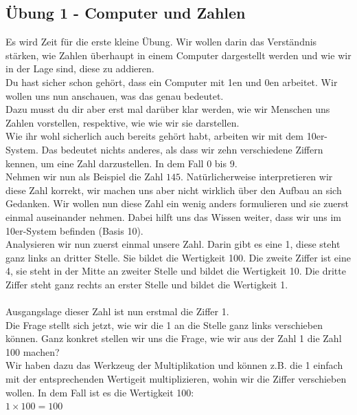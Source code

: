 \subsection{Übung 1 - Computer und Zahlen}
Es wird Zeit für die erste kleine Übung. Wir wollen darin das Verständnis stärken, wie Zahlen überhaupt in einem Computer
dargestellt werden und wie wir in der Lage sind, diese zu addieren.\\
Du hast sicher schon gehört, dass ein Computer mit 1en und 0en arbeitet. Wir wollen uns nun anschauen, was das genau bedeutet.\\
Dazu musst du dir aber erst mal darüber klar werden, wie wir Menschen uns Zahlen vorstellen, respektive, wie wie wir
sie darstellen.\\
Wie ihr wohl sicherlich auch bereits gehört habt, arbeiten wir mit dem 10er-System. Das bedeutet nichts anderes, als dass
wir zehn verschiedene Ziffern kennen, um eine Zahl darzustellen. In dem Fall 0 bis 9.\\
Nehmen wir nun als Beispiel die Zahl $145$.
Natürlicherweise interpretieren wir diese Zahl korrekt, wir machen uns aber nicht
wirklich über den Aufbau an sich Gedanken. Wir wollen nun diese Zahl ein wenig anders formulieren und sie zuerst einmal
auseinander nehmen. Dabei hilft uns das Wissen weiter, dass wir uns im 10er-System befinden (Basis 10).\\
Analysieren wir nun zuerst einmal unsere Zahl. Darin gibt es eine 1, diese steht ganz links an dritter Stelle. Sie bildet die Wertigkeit 100.
Die zweite Ziffer ist eine  4, sie steht in der Mitte an zweiter Stelle und bildet die Wertigkeit 10. Die dritte Ziffer steht ganz rechts an erster Stelle
und bildet die Wertigkeit 1.\\\\
Ausgangslage dieser Zahl ist nun erstmal die Ziffer 1.\\
Die Frage stellt sich jetzt, wie wir die 1 an die Stelle ganz links verschieben können. Ganz konkret stellen wir uns die
Frage, wie wir aus der Zahl 1 die Zahl 100 machen?\\
Wir haben dazu das Werkzeug der Multiplikation und können z.B. die 1 einfach mit der entsprechenden Wertigeit multiplizieren, wohin
wir die Ziffer verschieben wollen. In dem Fall ist es die Wertigkeit 100:\\
$1 \times 100 = 100$\\
